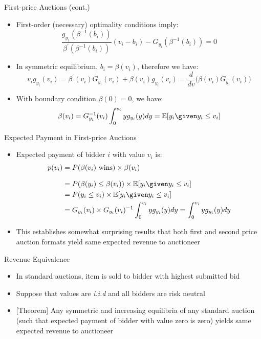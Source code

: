\documentclass[11pt,aspectratio=169,handout]{beamer}
\begin{document}
  \begin{frame}{First-price Auctions (cont.)}
   \begin{itemize}
    \item First-order (necessary) \alert{optimality conditions} imply\footnotemark{}:
    $$\frac{g_{y_1}(\beta^{-1}(b_i))}{\beta^\prime(\beta^{-1}(b_i))}(v_i-b_i)-G_{y_i}(\beta^{-1}(b_i))=0$$
    \item In symmetric equilibrium, $b_i = \beta (v_i)$, therefore we have:
     \begin{equation*}
      v_i g_{y_i}(v_i)=\beta^\prime(v_i)G_{y_i}(v_i)+\beta(v_i)g_{y_i}(v_i)=\frac{d}{dv}\big(\beta(v_i)G_{y_i}(v_i)\big)
     \end{equation*}
    \item With \alert{boundary condition} $\beta(0)=0$, we have: 
     \begin{equation*}
      \beta(v_i) = G_{y_i}^{-1}(v_i)\int_0^{v_i}yg_{y_i}(y)dy=\mathbb{E}[y_i \given y_i\le v_i]
     \end{equation*}
   \end{itemize}
  \end{frame}
  
  
  \begin{frame}{Expected Payment in First-price Auctions}
   \begin{itemize}
    \item Expected payment of bidder $i$ with value $v_i$ is:
     \begin{align*}
      p(v_i)&=P(\beta(v_i)\text{ wins})\times \beta(v_i)\\[0.8em]
      &=P(\beta(y_i) \le \beta(v_i))\times \mathbb{E}[y_i\given y_i\le v_i]\\
      &=P(y_i\le v_i)\times \mathbb{E}[y_i\given y_i\le v_i]\\
      &=G_{y_i}(v_i)\times G_{y_i}(v_i)^{-1}\int_0^{v_i}yg_{y_i}(y)dy =\int_0^{v_i}yg_{y_i}(y)dy
     \end{align*}
    \item This establishes somewhat surprising results that both first and second price auction formats yield \alert{same expected revenue} to auctioneer
   \end{itemize}
  \end{frame}
  
  
  \begin{frame}{Revenue Equivalence}
   \begin{itemize}[<+->]
   \setlength{\itemsep}{1.2em}
    \item In \alert{standard auctions}, item is sold to bidder with highest submitted bid
    \item Suppose that values are \textit{i.i.d} and all bidders are risk neutral
    \item \alert{[Theorem]} Any symmetric and increasing equilibria of any standard auction (such that expected payment of bidder with value zero is zero) yields same expected revenue to auctioneer  
   \end{itemize}
  \end{frame}
  
\end{document}
